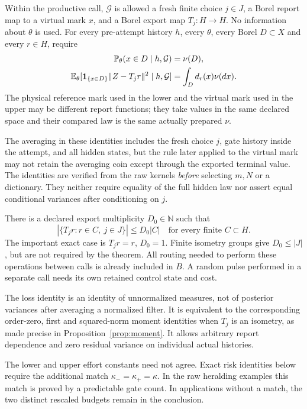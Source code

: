 Within the productive call, $\mathcal G$ is allowed a fresh finite choice $j\in J$, a Borel report map to a virtual mark $x$, and a Borel export map $T_j:H\to H$. No information about $\theta$ is used. For every pre-attempt history $h$, every $\theta$, every Borel $D\subset X$ and every $r\in H$, require
\begin{align}
 \mathbb P_\theta(x\in D\mid h,\mathcal G)&=\nu(D),\label{eq:mass-balance}\\
 \mathbb E_\theta[\mathbf1_{\{x\in D\}}\|Z-T_jr\|^2\mid h,\mathcal G]
   &=\int_D d_r(x)\nu(dx).\label{eq:loss-balance}
\end{align}
The physical reference mark used in the lower and the virtual mark used in the upper may be different report functions; they take values in the same declared space and their compared law is the same actually prepared $\nu$.

The averaging in these identities includes the fresh choice $j$, gate history inside the attempt, and all hidden states, but the rule later applied to the virtual mark may not retain the averaging coin except through the exported terminal value. The identities are verified from the raw kernels \emph{before} selecting $m,N$ or a dictionary. They neither require equality of the full hidden law nor assert equal conditional variances after conditioning on $j$.

There is a declared export multiplicity $D_0\in\mathbb N$ such that
\begin{equation}\label{eq:export}
 \left|\{T_jr:r\in C,\ j\in J\}\right|\le D_0|C|
 \quad\text{for every finite }C\subset H.
\end{equation}
The important exact case is $T_jr=r$, $D_0=1$. Finite isometry groups give $D_0\le|J|$, but are not required by the theorem. All routing needed to perform these operations between calls is already included in $B$. A random pulse performed in a separate call needs its own retained control state and cost.

The loss identity is an identity of unnormalized measures, not of posterior variances after averaging a normalized filter. It is equivalent to the corresponding order-zero, first and squared-norm moment identities when $T_j$ is an isometry, as made precise in Proposition~\ref{prop:moment}. It allows arbitrary report dependence and zero residual variance on individual actual histories.

The lower and upper effort constants need not agree. Exact risk identities below require the additional match $\kappa_- =\kappa_+=\kappa$. In the raw heralding examples this match is proved by a predictable gate count. In applications without a match, the two distinct rescaled budgets remain in the conclusion.
